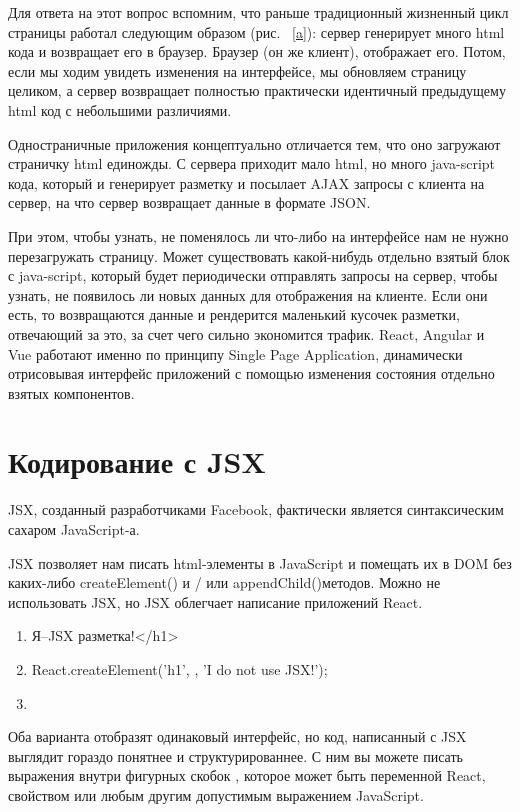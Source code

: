 \documentclass[a4paper,12pt]{diplom}
\begin{document}
Для ответа на этот вопрос вспомним, что раньше традиционный жизненный цикл страницы работал следующим образом (рис. ~\ref{a}): сервер генерирует много html кода и возвращает его в браузер. Браузер (он же клиент), отображает его. Потом, если мы ходим увидеть изменения на интерфейсе, мы обновляем страницу целиком, а сервер возвращает полностью практически идентичный предыдущему html код с небольшими различиями.

Одностраничные приложения концептуально отличается тем, что оно загружают страничку html единожды. С сервера приходит мало html, но много java-script кода, который и генерирует разметку и посылает AJAX запросы с клиента на сервер, на что сервер возвращает данные в формате JSON. 

При этом, чтобы узнать, не поменялось ли что-либо на интерфейсе нам не нужно перезагружать страницу. Может существовать какой-нибудь отдельно взятый блок с java-script, который будет периодически отправлять запросы на сервер, чтобы узнать, не появилось ли новых данных для отображения на клиенте. Если они есть, то возвращаются данные и рендерится маленький кусочек разметки, отвечающий за это, за счет чего сильно экономится трафик. React, Angular и Vue работают именно по принципу Single Page Application, динамически отрисовывая интерфейс приложений с помощью изменения состояния отдельно взятых компонентов.

\section{Кодирование с JSX}

JSX, созданный разработчиками Facebook, фактически  является синтаксическим сахаром JavaScript-а.

JSX позволяет нам писать html-элементы в JavaScript и помещать их в DOM без каких-либо createElement()  и / или appendChild()методов. Можно не использовать JSX, но JSX облегчает написание приложений React.
\begin{enumerate}
\item <h1>Я--JSX разметка!</h1>
\item React.createElement('h1', {}, 'I do not use JSX!');
\item \end{enumerate}

Оба варианта отобразят одинаковый интерфейс, но код, написанный с JSX выглядит гораздо понятнее и структурированнее. С ним вы можете писать выражения внутри фигурных скобок { }, которое
может быть переменной React, свойством или любым другим допустимым выражением JavaScript.
\end{document}
